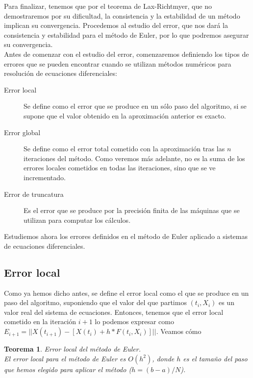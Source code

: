 \documentclass[12pt]{article}       %
\newtheorem{theorem}{Teorema}
\begin{document}
Para finalizar, tenemos que por el teorema de Lax-Richtmyer, que no demostraremos por su dificultad, la consistencia y la estabilidad de un método implican su convergencia. Procedemos al estudio del error, que nos dará la consistencia y estabilidad para el método de Euler, por lo que podremos asegurar su convergencia.\\

Antes de comenzar con el estudio del error, comenzaremos definiendo los tipos de errores que se pueden encontrar cuando se utilizan métodos numéricos para resolución de ecuaciones diferenciales:

\begin{description}
\item[Error local] Se define como el error que se produce en un sólo paso del algoritmo, si se supone que el valor obtenido en la aproximación anterior es exacto.
\item[Error global] Se define como el error total cometido con la aproximación tras las $n$ iteraciones del método. Como veremos más adelante, no es la suma de los errores locales cometidos en todas las iteraciones, sino que se ve incrementado.
\item[Error de truncatura] Es el error que se produce por la precisión finita de las máquinas que se utilizan para computar los cálculos.
\end{description}

Estudiemos ahora los errores definidos en el método de Euler aplicado a sistemas de ecuaciones diferenciales.

\subsection{Error local}

Como ya hemos dicho antes, se define el error local como el que se produce en un paso del algoritmo, suponiendo que el valor del que partimos $(t_i, X_i)$ es un valor real del sistema de ecuaciones. Entonces, tenemos que el error local cometido en la iteración $i+1$ lo podemos expresar como $E_{i+1} = ||X(t_{i+1}) - [X(t_{i}) + h*F(t_i, X_i)] ||$. Veamos cómo 

\begin{theorem} Error local del método de Euler.\\

El error local para el método de Euler es $O(h^2)$, donde $h$ es el tamaño del paso que hemos elegido para aplicar el método ($h=(b-a)/N$).

\end{theorem}
\end{document}
